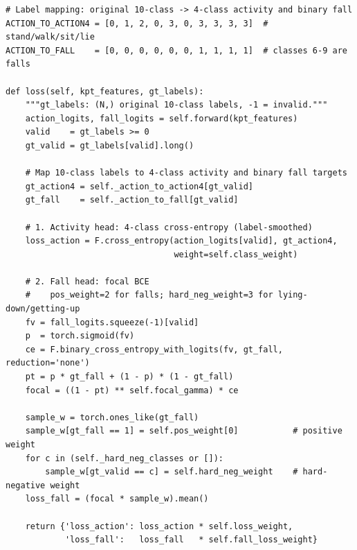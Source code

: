 \begin{lstlisting}[caption={ActionHead.loss -- 4-class CE and focal BCE with hard-negative weighting},
                   label={lst:action-loss}]
# Label mapping: original 10-class -> 4-class activity and binary fall
ACTION_TO_ACTION4 = [0, 1, 2, 0, 3, 0, 3, 3, 3, 3]  # stand/walk/sit/lie
ACTION_TO_FALL    = [0, 0, 0, 0, 0, 0, 1, 1, 1, 1]  # classes 6-9 are falls

def loss(self, kpt_features, gt_labels):
    """gt_labels: (N,) original 10-class labels, -1 = invalid."""
    action_logits, fall_logits = self.forward(kpt_features)
    valid    = gt_labels >= 0
    gt_valid = gt_labels[valid].long()

    # Map 10-class labels to 4-class activity and binary fall targets
    gt_action4 = self._action_to_action4[gt_valid]
    gt_fall    = self._action_to_fall[gt_valid]

    # 1. Activity head: 4-class cross-entropy (label-smoothed)
    loss_action = F.cross_entropy(action_logits[valid], gt_action4,
                                  weight=self.class_weight)

    # 2. Fall head: focal BCE
    #    pos_weight=2 for falls; hard_neg_weight=3 for lying-down/getting-up
    fv = fall_logits.squeeze(-1)[valid]
    p  = torch.sigmoid(fv)
    ce = F.binary_cross_entropy_with_logits(fv, gt_fall, reduction='none')
    pt = p * gt_fall + (1 - p) * (1 - gt_fall)
    focal = ((1 - pt) ** self.focal_gamma) * ce

    sample_w = torch.ones_like(gt_fall)
    sample_w[gt_fall == 1] = self.pos_weight[0]           # positive weight
    for c in (self._hard_neg_classes or []):
        sample_w[gt_valid == c] = self.hard_neg_weight    # hard-negative weight
    loss_fall = (focal * sample_w).mean()

    return {'loss_action': loss_action * self.loss_weight,
            'loss_fall':   loss_fall   * self.fall_loss_weight}
\end{lstlisting}
